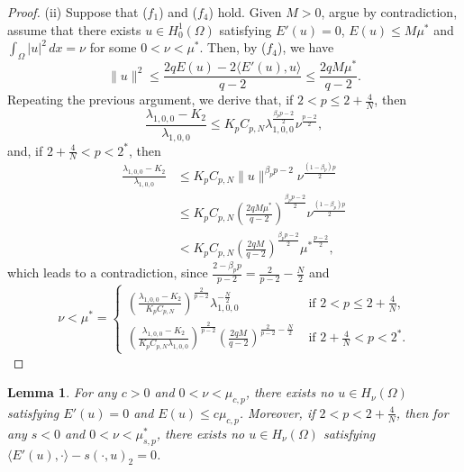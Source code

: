 \documentclass[11pt]{amsart}
\newtheorem{lemma}[theorem]{Lemma}
\newcommand{\norm}[1]{\lVert#1\rVert}
\numberwithin{equation}{section}
\begin{document}
\begin{proof}
    (ii) Suppose that ($f_1$) and ($f_4$) hold. Given $M>0$, argue by contradiction, assume that there exists $u \in H_0^1(\Omega)$ satisfying $E'(u) = 0$, $E(u)\leq M\mu^*$ and $\int_{\Omega}|u|^2\,dx=\nu$ for some $0<\nu<\mu^*$. Then, by ($f_4$), we have
    $$
    \norm{u}^2 \leq \frac{2qE(u)-2\langle E'(u),u\rangle}{q-2}\leq \frac{2qM\mu^*}{q-2}.
    $$
    Repeating the previous argument, we derive that, if $2<p\leq2+\frac{4}{N}$, then
    $$
    \frac{\lambda_{1,0,0}-K_2}{\lambda_{1,0,0}}\leq K_{p} C_{p,N} \lambda_{1,0,0}^\frac{{\beta_{p}{p}-2}}{2}\nu^\frac{p-2}{2},
    $$
    and, if $2+\frac{4}{N}<p<2^*$, then
    $$
    \begin{aligned}
        \frac{\lambda_{1,0,0}-K_2}{\lambda_{1,0,0}}&\leq K_{p} C_{p,N}\norm{u}^{\beta_{p}{p}-2}\nu^\frac{(1-\beta_{p}){p}}{2}\\
        &\leq K_{p} C_{p,N}\left(\frac{2qM\mu^*}{q-2}\right)^\frac{{\beta_{p}{p}-2}}{2}{\nu}^\frac{(1-\beta_p) p}{2}\\
        &<K_{p} C_{p,N}\left(\frac{2qM}{q-2}\right)^\frac{{\beta_{p}{p}-2}}{2}{\mu^*}^\frac{p-2}{2},
    \end{aligned}
    $$
    which leads to a contradiction, since $\frac{2-\beta_pp}{p-2}=\frac{2}{p-2}-\frac{N}{2}$ and
 $$\nu < \mu^*=
\begin{cases}
    \left(\frac{\lambda_{1,0,0}-K_2}{K_pC_{p,N}}\right)^{\frac{2}{p-2}}\lambda_{1,0,0}^{-\frac{N}{2}}  &\text{ if } 2<p\leq 2+\frac{4}{N},\\
    \left(\frac{\lambda_{1,0,0}-K_2}{K_pC_{p,N}\lambda_{1,0,0}}\right)^{\frac{2}{p-2}}\left(\frac{2qM}{q-2}\right)^{\frac{2}{p-2}-\frac{N}{2}} &\text{ if }  2+\frac{4}{N}<p<2^*.
\end{cases}$$
\end{proof}
\iffalse
\begin{lemma}
    For any $c>0$ and $0<\nu<\mu_{c,p}$, there exists no $u \in H_\nu(\Omega)$ satisfying $E'(u) = 0$ and $E(u)\leq c\mu_{c,p}$. Moreover, if $2<p<2+\frac{4}{N}$, then for any $s<0$ and $0<\nu<\mu_{s,p}^*$, there exists no $u \in H_\nu(\Omega)$ satisfying $\langle E'(u),\cdot \rangle-s(\cdot,u)_2 = 0$.
\end{lemma}
\end{document}
